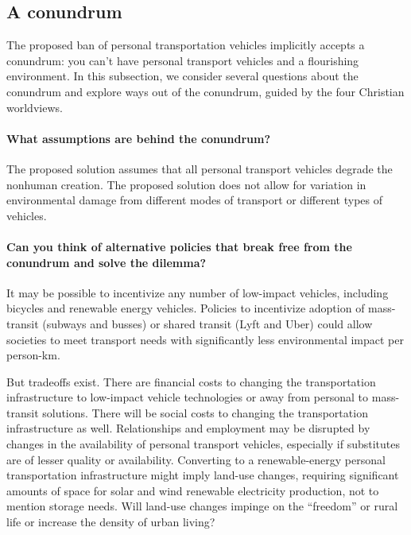 \documentclass[12pt]{article}
\begin{document}
\subsection{A conundrum}
\label{sec:conundrum}

The proposed ban of personal transportation vehicles
implicitly accepts a conundrum: 
you can't have personal transport vehicles and a flourishing environment. 
In this subsection, we consider several questions about the conundrum and 
explore ways out of the conundrum,
guided by the four Christian worldviews.

\paragraph{What assumptions are behind the conundrum?} 

The proposed solution assumes that all personal transport vehicles degrade the nonhuman creation. 
The proposed solution does not allow for variation in environmental damage
from different modes of transport or different types of vehicles.

\paragraph{Can you think of alternative policies that break free from the conundrum and solve the dilemma?} 

It may be possible to incentivize any number of low-impact vehicles, including 
bicycles and renewable energy vehicles.
Policies to incentivize adoption of 
mass-transit (subways and busses) or shared transit (Lyft and Uber)
could allow societies to meet transport needs with significantly less environmental impact 
per person-km.

But tradeoffs exist. 
There are financial costs to changing the transportation infrastructure to low-impact vehicle technologies
or away from personal to mass-transit solutions. 
There will be social costs to changing the transportation infrastructure as well.
Relationships and employment may be disrupted by changes in the availability of personal transport vehicles,
especially if substitutes are of lesser quality or availability.
Converting to a renewable-energy personal transportation infrastructure 
might imply land-use changes, 
requiring significant amounts of space for solar and wind renewable electricity production,
not to mention storage needs. 
Will land-use changes impinge on the ``freedom'' or rural life 
or increase the density of urban living?
\end{document}
